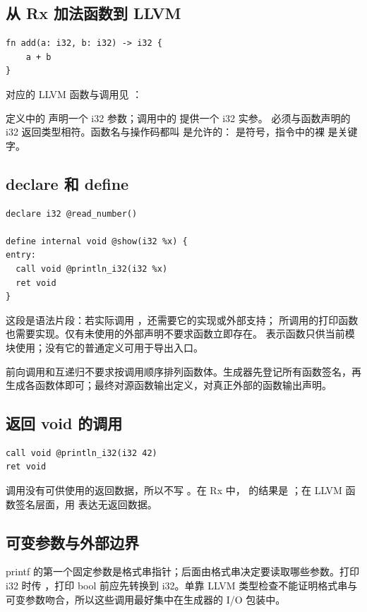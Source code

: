 
\subsection{从 Rx 加法函数到 LLVM}
\begin{lstlisting}[language=Rx,numbers=none]
fn add(a: i32, b: i32) -> i32 {
    a + b
}
\end{lstlisting}
对应的 LLVM 函数与调用见 ：


定义中的  声明一个 i32 参数；调用中的  提供一个 i32 实参。 必须与函数声明的 i32 返回类型相符。函数名与操作码都叫  是允许的： 是符号，指令中的裸  是关键字。

\subsection{declare 和 define}
\begin{lstlisting}
declare i32 @read_number()

define internal void @show(i32 %x) {
entry:
  call void @println_i32(i32 %x)
  ret void
}
\end{lstlisting}
这段是语法片段：若实际调用 ，还需要它的实现或外部支持； 所调用的打印函数也需要实现。仅有未使用的外部声明不要求函数立即存在。 表示函数只供当前模块使用；没有它的普通定义可用于导出入口。

前向调用和互递归不要求按调用顺序排列函数体。生成器先登记所有函数签名，再生成各函数体即可；最终对源函数输出定义，对真正外部的函数输出声明。

\subsection{返回 void 的调用}
\begin{lstlisting}
call void @println_i32(i32 42)
ret void
\end{lstlisting}
 调用没有可供使用的返回数据，所以不写 。在 Rx 中， 的结果是 \code{()}；在 LLVM 函数签名层面，用  表达无返回数据。

\subsection{可变参数与外部边界}
printf 的第一个固定参数是格式串指针；后面由格式串决定要读取哪些参数。打印 i32 时传 ，打印 bool 前应先转换到 i32。单靠 LLVM 类型检查不能证明格式串与可变参数吻合，所以这些调用最好集中在生成器的 I/O 包装中。

